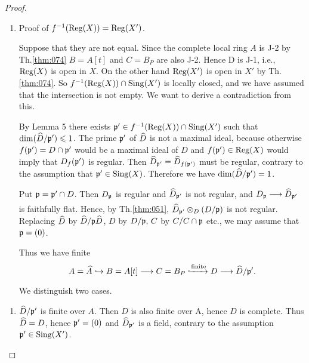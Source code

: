\documentclass[../main]{subfiles}
\begin{document}
\begin{proof}
\begin{enumerate}[label = Step \Roman*.]
    \item Proof of $f^{-1}(\operatorname{Reg}(X))=\operatorname{Reg}(X')$.

Suppose that they are not equal. Since the complete local ring $A$ is J-2 by Th.\ref{thm:074} $ B=A[t]$ and $C=B_P$ are also J-2. Hence D is J-1, i.e., $\operatorname{Reg}(X)$ is open in $X$. On the other hand $\operatorname{Reg}(X')$ is open in $X'$ by Th.\ref{thm:074}. So $f^{-1}(\operatorname{Reg}(X)) \cap \operatorname{Sing}(X')$ is locally closed, and we have assumed that the intersection is not empty. We want to derive a contradiction from this.

By Lemma 5 there exists $\mathfrak{p}' \in f^{-1}(\operatorname{Reg}(X)) \cap \operatorname{Sing}(X')$ such that \newline $\operatorname{dim}(\widehat{D} / \mathfrak{p}') \leqslant 1$. The prime $\mathfrak{p}'$ of $\widehat{D}$ is not a maximal ideal, because otherwise $f(\mathfrak{p}')=D \cap \mathfrak{p}'$ would be a maximal ideal of $D$ and \newline $f(\mathfrak{p}') \in \operatorname{Reg}(X)$ would imply that $D_f(\mathfrak{p}')$ is regular. Then $\widehat{D}_{ \mathfrak{p}'}=\widehat{D}_{f(\mathfrak{p}')}$ must be regular, contrary to the assumption that $\mathfrak{p}' \in \operatorname{Sing}(X)$. Therefore we have $\operatorname{dim}(\widehat{D} / \mathfrak{p}')=1$.

Put $\mathfrak{p}=\mathfrak{p}' \cap D$. Then $D_{\mathfrak{p}}$ is regular and $\widehat{D}_{\mathfrak{p}'}$ is not regular, and $D_\ideal{p} \varrightarrow{} \completion{D}_{\ideal{p}'}$ is faithfully flat. Hence, by Th.\ref{thm:051}, $\widehat{D}_{ \mathfrak{p}'} \otimes_D(D / \mathfrak{p})$ is not regular. Replacing $\widehat{D}$ by $\widehat{D} / \mathfrak{p} \widehat{D}$, $D$ by $D / \mathfrak{p},\, C$ by $C / C \cap \mathfrak{p}$ etc., we may assume that $\mathfrak{p}=(0)$.

Thus we have finite
\[A=\completion{A} \hookrightarrow B=A[t] \varrightarrow{} C=B_P \xhookrightarrow{\text{finite}}D \varrightarrow{} \completion{D} / \ideal{p}' .\]
We distinguish two cases.
\end{enumerate}
\begin{enumerate}[label = Case \arabic*.]
    \item $\widehat{D} / \mathfrak{p}'$ is finite over $A$. Then $D$ is also finite over A, hence $D$ is complete. Thus $\widehat{D}=D$, hence $\mathfrak{p}'=(0)$ and $\widehat{D}_{\mathfrak{p}'}$ is a field, contrary to the assumption $\mathfrak{p}' \in \operatorname{Sing}(X')$.
    

\end{enumerate}
\end{proof}
\end{document}
